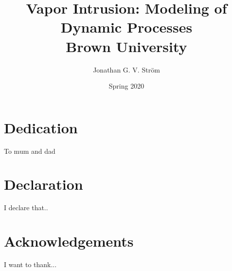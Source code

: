 \documentclass[12pt,twoside]{report}
\begin{document}
\title{
{Vapor Intrusion: Modeling of Dynamic Processes}\\ %
{\large Brown University}\\
}
\author{Jonathan G. V. Ström}
\date{Spring 2020}

\maketitle







\chapter*{Dedication}
To mum and dad

\chapter*{Declaration}
I declare that..

\chapter*{Acknowledgements}
I want to thank...

\tableofcontents{}





\appendix
\end{document}
